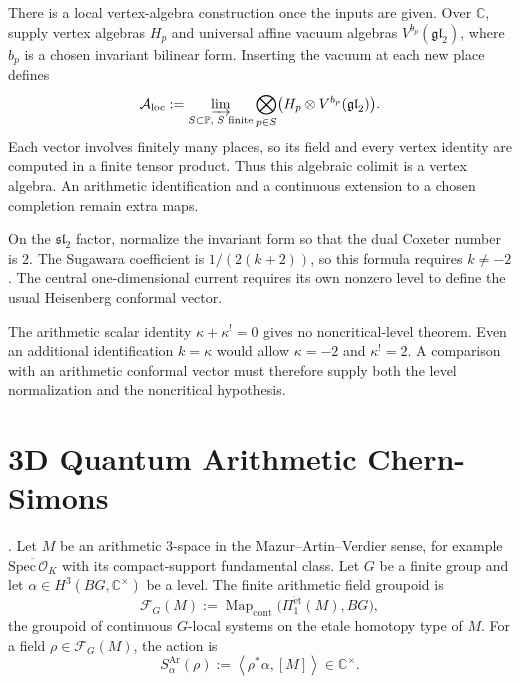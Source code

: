 There is a local vertex-algebra construction once the inputs are
given. Over \(\mathbb C\), supply vertex algebras \(H_p\) and
universal affine vacuum algebras \(V^{b_p}(\mathfrak{gl}_2)\),
where \(b_p\) is a chosen invariant bilinear form. Inserting the
vacuum at each new place defines
\begin{equation}
\label{v4-arith:3d-acs:eq:km-enh}
 \mathcal A_{\mathrm{loc}}
 :=\varinjlim_{S\subset\mathbb P,\;S\text{ finite}}
       \bigotimes_{p\in S}
       \bigl(H_p\otimes V^{b_p}(\mathfrak{gl}_2)\bigr).
\end{equation}
Each vector involves finitely many places, so its field and every
vertex identity are computed in a finite tensor product. Thus this
algebraic colimit is a vertex algebra. An arithmetic identification
and a continuous extension to a chosen completion remain extra maps.

\begin{remark}
\label{v4-arith:3d-acs:rem:critical-level}
On the \(\mathfrak{sl}_2\) factor, normalize the invariant form so
that the dual Coxeter number is \(2\). The Sugawara coefficient is
\(1/(2(k+2))\), so this formula requires \(k\ne-2\).
The central one-dimensional current requires its own nonzero level
to define the usual Heisenberg conformal vector.

The arithmetic scalar identity \(\kappa+\kappa^!=0\) gives no
noncritical-level theorem. Even an additional identification
\(k=\kappa\) would allow \(\kappa=-2\) and \(\kappa^!=2\).
A comparison with an arithmetic conformal vector must therefore
supply both the level normalization and the noncritical hypothesis.
\end{remark}

\section{3D Quantum Arithmetic Chern-Simons}
\label{v4-arith:3d-acs:qu-acs}

\begin{definition}
\label{v4-arith:3d-acs:def:finite-field-groupoid}
\ClaimStatusDefinitional. Let \(M\) be an arithmetic 3-space in the
Mazur--Artin--Verdier sense, for example
\(\overline{\mathrm{Spec}\,\mathcal O_{K}}\) with its compact-support
fundamental class. Let \(G\) be a finite group and let
\(\alpha\in H^{3}(BG,\mathbb C^{\times})\) be a level. The finite
arithmetic field groupoid is
\[
\mathcal F_{G}(M):=\operatorname{Map}_{\mathrm{cont}}
\bigl(\Pi^{\mathrm{\acute et}}_{1}(M),BG\bigr),
\]
the groupoid of continuous \(G\)-local systems on the etale homotopy
type of \(M\). For a field \(\rho\in\mathcal F_{G}(M)\), the action is
\[
S_{\alpha}^{\mathrm{Ar}}(\rho):=
\left\langle \rho^{*}\alpha,[M]\right\rangle\in\mathbb C^{\times}.
\]
\end{definition}

